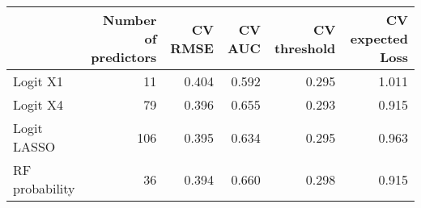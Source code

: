 
\begin{tabular}{lrrrrr}
\toprule
  & Number of predictors & CV RMSE & CV AUC & CV threshold & CV expected Loss\\
\midrule
Logit X1 & 11 & 0.404 & 0.592 & 0.295 & 1.011\\
Logit X4 & 79 & 0.396 & 0.655 & 0.293 & 0.915\\
Logit LASSO & 106 & 0.395 & 0.634 & 0.295 & 0.963\\
RF probability & 36 & 0.394 & 0.660 & 0.298 & 0.915\\
\bottomrule
\end{tabular}